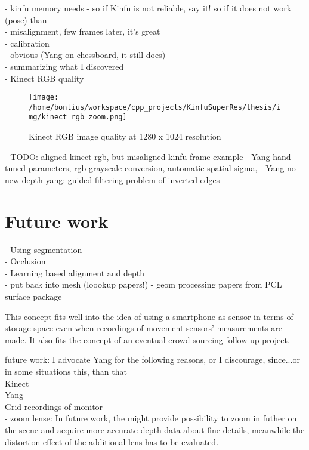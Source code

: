 \documentclass{ucl_thesis}
\begin{document}
	- kinfu memory needs
	- so if Kinfu is not reliable, say it! so if it does not work (pose) than \citep{Whelan13icra} \\
	- misalignment, few frames later, it's great \\
	- calibration \\
    - obvious (Yang on chessboard, it still does) \\
    - summarizing what I discovered \\
    - Kinect RGB quality \\
    \begin{figure}[h!]\centering
        \texttt{[image: /home/bontius/workspace/cpp\_projects/KinfuSuperRes/thesis/img/kinect\_rgb\_zoom.png]}
        \caption{Kinect RGB image quality at 1280 x 1024 resolution}
        \label{fig:kinect_rgb_zoom}
    \end{figure}
    - TODO: aligned kinect-rgb, but misaligned kinfu frame example
    - Yang hand-tuned parameters, rgb grayscale conversion, automatic spatial sigma, 
    - Yang no new depth
yang:     guided filtering problem of inverted edges
    
\section{Future work}
\label{sec:future_work}

- Using segmentation \citep{Silberman:ECCV12} \\
- Occlusion \citep{Hoiem:2011} \\
- Learning based alignment and depth \citep{Herrera:LearnedJointMRF} \\
- put back into mesh (loookup papers!)
- geom processing papers from PCL surface package

This concept fits well into the idea of using a smartphone as sensor in terms of storage space even when recordings of movement sensors' measurements are made. It also fits the concept of an eventual crowd sourcing follow-up project. 

future work: I advocate Yang for the following reasons, or I discourage, since...or in some situations this, than that \\
Kinect \\
Yang \\
Grid recordings of monitor\\

    - zoom lense: \citep{Kinect_nyko_zoom}
In future work, the \citep{Kinect_nyko_zoom} might provide possibility to zoom in futher on the scene and acquire more accurate depth data about fine details, meanwhile the distortion effect of the additional lens has to be evaluated.
\end{document}
